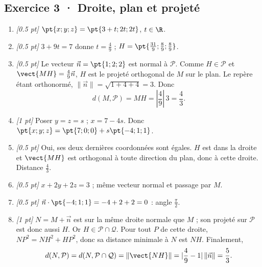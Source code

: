 \subsection*{Exercice 3 · Droite, plan et projeté}\begin{enumerate}

\item \textit{[\num{0,5} pt]} $\pt{x;y;z}=\pt{3+t;2t;2t}$, $t\in\R$.

\item \textit{[\num{0,5} pt]} $3+9t=7$ donne $t=\frac{4}{9}$ ; $H=\pt{\frac{31}{9};\frac{8}{9};\frac{8}{9}}$.

\item \textit{[\num{0,5} pt]} Le vecteur $\vec n=\pt{1;2;2}$ est normal à $\mathcal P$. Comme $H\in\mathcal P$ et $\vect{MH}=\frac{4}{9}\vec n$, $H$ est le projeté orthogonal de $M$ sur le plan. Le repère étant orthonormé, $\|\vec n\|=\sqrt{1+4+4}=3$. Donc
\[d(M,\mathcal P)=MH=|\frac{4}{9}|\,3=\frac{4}{3}.\]

\item \textit{[1 pt]} Poser $y=z=s$ ; $x=7-4s$. Donc $\pt{x;y;z}=\pt{7;0;0}+s\pt{-4;1;1}$.

\item \textit{[\num{0,5} pt]} Oui, ses deux dernières coordonnées sont égales. $H$ est dans la droite et $\vect{MH}$ est orthogonal à toute direction du plan, donc à cette droite. Distance $\frac{4}{3}$.

\item \textit{[\num{0,5} pt]} $x+2y+2z=3$ ; même vecteur normal et passage par $M$.

\item \textit{[\num{0,5} pt]} $\vec n\cdot\pt{-4;1;1}=-4+2+2=0$ : angle $\frac{\pi}{2}$.

\item \textit{[1 pt]} $N=M+\vec n$ est sur la même droite normale que $M$ ; son projeté sur $\mathcal P$ est donc aussi $H$. Or $H\in\mathcal P\cap\mathcal Q$. Pour tout $P$ de cette droite, $NP^2=NH^2+HP^2$, donc sa distance minimale à $N$ est $NH$. Finalement,
\[d(N,\mathcal P)=d(N,\mathcal P\cap\mathcal Q)=\|\vect{NH}\|=|\frac{4}{9}-1|\,\|\vec n\|=\frac{5}{3}.\]

\end{enumerate}

